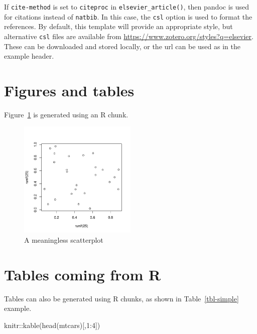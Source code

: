 \documentclass[
  letterpaper,
  DIV=11,
  numbers=noendperiod]{scrartcl}
\newenvironment{Shaded}{\begin{snugshade}}{\end{snugshade}}
\newcommand{\DecValTok}[1]{\textcolor[rgb]{0.68,0.00,0.00}{#1}}
\newcommand{\FunctionTok}[1]{\textcolor[rgb]{0.28,0.35,0.67}{#1}}
\newcommand{\NormalTok}[1]{\textcolor[rgb]{0.00,0.23,0.31}{#1}}
\newcommand{\SpecialCharTok}[1]{\textcolor[rgb]{0.37,0.37,0.37}{#1}}
\begin{document}
If \texttt{cite-method} is set to \texttt{citeproc} in
\texttt{elsevier\_article()}, then pandoc is used for citations instead
of \texttt{natbib}. In this case, the \texttt{csl} option is used to
format the references. By default, this template will provide an
appropriate style, but alternative \texttt{csl} files are available from
\url{https://www.zotero.org/styles?q=elsevier}. These can be downloaded
and stored locally, or the url can be used as in the example header.

\hypertarget{figures-and-tables}{%
\section{Figures and tables}\label{figures-and-tables}}

Figure~\ref{fig-meaningless} is generated using an R chunk.

\begin{figure}

{\centering \includegraphics[width=0.5\textwidth,height=\textheight]{manuscript_files/figure-pdf/fig-meaningless-1.pdf}

}

\caption{\label{fig-meaningless}A meaningless scatterplot}

\end{figure}

\hypertarget{tables-coming-from-r}{%
\section{Tables coming from R}\label{tables-coming-from-r}}

Tables can also be generated using R chunks, as shown in
Table~\ref{tbl-simple} example.

\begin{Shaded}
\begin{Highlighting}[]
\NormalTok{knitr}\SpecialCharTok{::}\FunctionTok{kable}\NormalTok{(}\FunctionTok{head}\NormalTok{(mtcars)[,}\DecValTok{1}\SpecialCharTok{:}\DecValTok{4}\NormalTok{])}
\end{Highlighting}
\end{Shaded}
\end{document}
